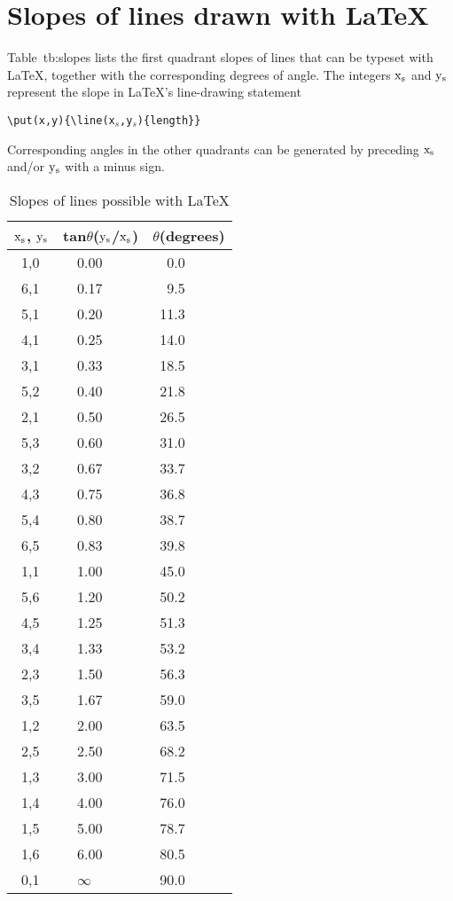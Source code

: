\chapter{Slopes of lines drawn with \LaTeX}\label{ap:slopes}
 Table~{tb:slopes}
 lists the first quadrant slopes of lines that can be
 typeset with \LaTeX, together with the corresponding degrees of
 angle. The integers ${\rm x_s}$ and ${\rm y_s}$ represent the
 slope in \LaTeX's line-drawing statement \\
 \begin{center}
{\verb+\put(x,y){\line(x+$_s$\verb+,y+$_s$\verb+){length}}+}
\end{center}
 Corresponding angles in the other quadrants can be
 generated by preceding ${\rm x_s}$ and/or ${\rm y_s}$ with
 a minus sign.
\begin{table}
\begin{center}
 \begin{tabular}{|l|l|l|}
       \hline
  ${\rm x_s}$, ${\rm y_s}$ & tan$\theta $(${\rm y_s}$/${\rm x_s}$) &
  $\theta $(degrees) \\
       \hline
  \ 1,0 & \ \ 0.00 & \ \ 0.0 \\
  \ 6,1 & \ \ 0.17 & \ \ 9.5 \\
  \ 5,1 & \ \ 0.20 & \ 11.3  \\
  \ 4,1 & \ \ 0.25 & \ 14.0  \\
  \ 3,1 & \ \ 0.33 & \ 18.5  \\
  \ 5,2 & \ \ 0.40 & \ 21.8  \\
  \ 2,1 & \ \ 0.50 & \ 26.5  \\
  \ 5,3 & \ \ 0.60 & \ 31.0  \\
  \ 3,2 & \ \ 0.67 & \ 33.7  \\
  \ 4,3 & \ \ 0.75 & \ 36.8  \\
  \ 5,4 & \ \ 0.80 & \ 38.7  \\
  \ 6,5 & \ \ 0.83 & \ 39.8  \\
  \ 1,1 & \ \ 1.00 & \ 45.0  \\
  \ 5,6 & \ \ 1.20 & \ 50.2  \\
  \ 4,5 & \ \ 1.25 & \ 51.3  \\
  \ 3,4 & \ \ 1.33 & \ 53.2  \\
  \ 2,3 & \ \ 1.50 & \ 56.3  \\
  \ 3,5 & \ \ 1.67 & \ 59.0  \\
  \ 1,2 & \ \ 2.00 & \ 63.5  \\
  \ 2,5 & \ \ 2.50 & \ 68.2  \\
  \ 1,3 & \ \ 3.00 & \ 71.5  \\
  \ 1,4 & \ \ 4.00 & \ 76.0  \\
  \ 1,5 & \ \ 5.00 & \ 78.7  \\
  \ 1,6 & \ \ 6.00 & \ 80.5  \\
  \ 0,1 & \ \ $\infty $& \ 90.0 \\
       \hline
 \end{tabular}
\end{center}
 
 \caption{Slopes of lines possible with \LaTeX}
\label{tb:slopes}
 \end{table}
 
 
